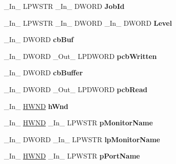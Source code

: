 \begin{DoxyCompactItemize}
\mbox{\label{struct___m_o_n_i_t_o_r_aecc2863ccaab5b9bb1fa4352522c42fe}} 
\+\_\+\+In\+\_\+ L\+P\+W\+S\+TR \+\_\+\+In\+\_\+ D\+W\+O\+RD {\bfseries Job\+Id}
\item 
\mbox{\label{struct___m_o_n_i_t_o_r_a721821cb8b12250381495ffa71bdd56b}} 
\+\_\+\+In\+\_\+ L\+P\+W\+S\+TR \+\_\+\+In\+\_\+ D\+W\+O\+RD \+\_\+\+In\+\_\+ D\+W\+O\+RD {\bfseries Level}
\item 
\mbox{\label{struct___m_o_n_i_t_o_r_aa7cba9ca2f26a9b9c59a7ab36281bad9}} 
\+\_\+\+In\+\_\+ D\+W\+O\+RD {\bfseries cb\+Buf}
\item 
\mbox{\label{struct___m_o_n_i_t_o_r_aa70c5807082e647c3b58a05160359ab8}} 
\+\_\+\+In\+\_\+ D\+W\+O\+RD \+\_\+\+Out\+\_\+ L\+P\+D\+W\+O\+RD {\bfseries pcb\+Written}
\item 
\mbox{\label{struct___m_o_n_i_t_o_r_a51a8e055d1bd313f3f6ccf9e558625bc}} 
\+\_\+\+In\+\_\+ D\+W\+O\+RD {\bfseries cb\+Buffer}
\item 
\mbox{\label{struct___m_o_n_i_t_o_r_a50d068dfb5c830b5bb7958efa420c1a6}} 
\+\_\+\+In\+\_\+ D\+W\+O\+RD \+\_\+\+Out\+\_\+ L\+P\+D\+W\+O\+RD {\bfseries pcb\+Read}
\item 
\mbox{\label{struct___m_o_n_i_t_o_r_a2f27e7fb819c5610b1a25bf905f0f643}} 
\+\_\+\+In\+\_\+ \hyperlink{interfacevoid}{H\+W\+ND} {\bfseries h\+Wnd}
\item 
\mbox{\label{struct___m_o_n_i_t_o_r_a11e107bef2ef20d5395b4a6e5fe95dec}} 
\+\_\+\+In\+\_\+ \hyperlink{interfacevoid}{H\+W\+ND} \+\_\+\+In\+\_\+ L\+P\+W\+S\+TR {\bfseries p\+Monitor\+Name}
\item 
\mbox{\label{struct___m_o_n_i_t_o_r_ae93e13c1e6bac4c4a79d162f9287c35d}} 
\+\_\+\+In\+\_\+ D\+W\+O\+RD \+\_\+\+In\+\_\+ L\+P\+W\+S\+TR {\bfseries lp\+Monitor\+Name}
\item 
\mbox{\label{struct___m_o_n_i_t_o_r_a0bd99bf8fee65093f2b10fa57a998aea}} 
\+\_\+\+In\+\_\+ \hyperlink{interfacevoid}{H\+W\+ND} \+\_\+\+In\+\_\+ L\+P\+W\+S\+TR {\bfseries p\+Port\+Name}

\end{DoxyCompactItemize}

